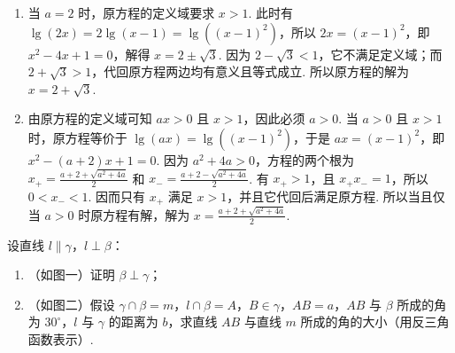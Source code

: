 \begin{solution}
\begin{enumerate}
\item 当 \(a=2\) 时，原方程的定义域要求 \(x>1\). 此时有 \(\lg(2x)=2\lg(x-1)=\lg\left((x-1)^2\right)\)，所以 \(2x=(x-1)^2\)，即 \(x^2-4x+1=0\)，解得 \(x=2\pm\sqrt{3}\). 因为 \(2-\sqrt{3}<1\)，它不满足定义域；而 \(2+\sqrt{3}>1\)，代回原方程两边均有意义且等式成立. 所以原方程的解为 \(x=2+\sqrt{3}\).
\item 由原方程的定义域可知 \(ax>0\) 且 \(x>1\)，因此必须 \(a>0\). 当 \(a>0\) 且 \(x>1\) 时，原方程等价于 \(\lg(ax)=\lg\left((x-1)^2\right)\)，于是 \(ax=(x-1)^2\)，即 \(x^2-(a+2)x+1=0\). 因为 \(a^2+4a>0\)，方程的两个根为 \(x_+=\frac{a+2+\sqrt{a^2+4a}}{2}\) 和 \(x_-=\frac{a+2-\sqrt{a^2+4a}}{2}\). 有 \(x_+>1\)，且 \(x_+x_-=1\)，所以 \(0<x_-<1\). 因而只有 \(x_+\) 满足 \(x>1\)，并且它代回后满足原方程. 所以当且仅当 \(a>0\) 时原方程有解，解为 \(x=\frac{a+2+\sqrt{a^2+4a}}{2}\).
\end{enumerate}
\end{solution}

\begin{problem}

设直线 \(l \parallel \gamma\)，\(l \perp \beta\)：

\begin{enumerate}
\item （如图一）证明 \(\beta \perp \gamma\)；
\item （如图二）假设 \(\gamma \cap \beta = m\)，\(l \cap \beta = A\)，\(B \in \gamma\)，\(AB = a\)，\(AB\) 与 \(\beta\) 所成的角为 \(30^\circ\)，\(l\) 与 \(\gamma\) 的距离为 \(b\)，求直线 \(AB\) 与直线 \(m\) 所成的角的大小（用反三角函数表示）.


\end{enumerate}



\end{problem}

